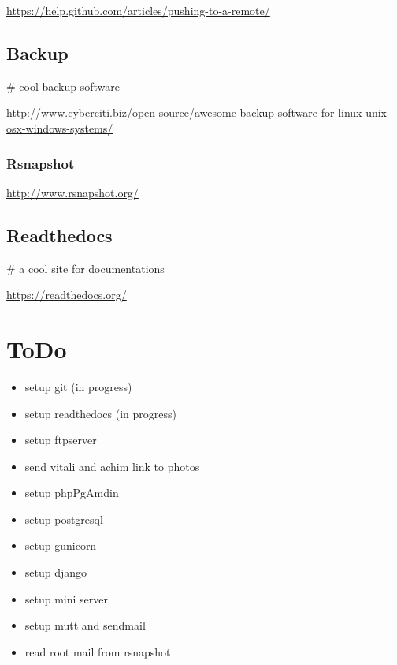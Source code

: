 \documentclass[letterpaper,10pt,english]{sphinxmanual}
\begin{document}
\href{https://help.github.com/articles/pushing-to-a-remote/}{https://help.github.com/articles/pushing-to-a-remote/}


\section{Backup}
\label{sdocs/backup/backup:backup}\label{sdocs/backup/backup::doc}
\# cool backup software

\href{http://www.cyberciti.biz/open-source/awesome-backup-software-for-linux-unix-osx-windows-systems/}{http://www.cyberciti.biz/open-source/awesome-backup-software-for-linux-unix-osx-windows-systems/}


\subsection{Rsnapshot}
\label{sdocs/backup/rsnapshot/rsnapshot::doc}\label{sdocs/backup/rsnapshot/rsnapshot:rsnapshot}
\href{http://www.rsnapshot.org/}{http://www.rsnapshot.org/}


\section{Readthedocs}
\label{sdocs/readthedocs/readthedocs:readthedocs}\label{sdocs/readthedocs/readthedocs::doc}
\# a cool site for documentations

\href{https://readthedocs.org/}{https://readthedocs.org/}


\chapter{ToDo}
\label{index:todo}\begin{itemize}
\item {} 
setup git (in progress)

\item {} 
setup readthedocs (in progress)

\item {} 
setup ftpserver

\item {} 
send vitali and achim link to photos

\item {} 
setup phpPgAmdin

\item {} 
setup postgresql

\item {} 
setup gunicorn

\item {} 
setup django

\item {} 
setup mini server

\item {} 
setup mutt and sendmail

\item {} 
read root mail from rsnapshot

\end{itemize}
\end{document}
